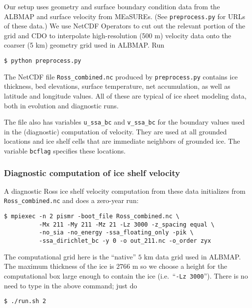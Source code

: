 Our setup uses geometry and surface boundary condition data from the ALBMAP and surface velocity from MEaSUREs.  (See \texttt{preprocess.py} for URLs of these data.)  We use NetCDF Operators to cut out the relevant portion of the grid and CDO to interpolate high-resolution (500 m) velocity data onto the coarser (5 km) geometry grid used in ALBMAP.  Run

\begin{verbatim}
$ python preprocess.py
\end{verbatim}%

The NetCDF file \texttt{Ross_combined.nc} produced by \texttt{preprocess.py} contains ice thickness, bed elevations, surface temperature, net accumulation, as well as latitude and longitude values.  All of these are typical of ice sheet modeling data, both in evolution and diagnostic runs.

The file also has variables \texttt{u_ssa_bc} and \texttt{v_ssa_bc} for the boundary values used in the (diagnostic) computation of velocity.  They are used at all grounded locations and ice shelf cells that are immediate neighbors of grounded ice.  The variable \texttt{bcflag} specifies these locations.


\subsubsection*{Diagnostic computation of ice shelf velocity}
A diagnostic Ross ice shelf velocity computation from these data initializes from \texttt{Ross_combined.nc} and does a zero-year run:

\begin{verbatim}
$ mpiexec -n 2 pismr -boot_file Ross_combined.nc \
          -Mx 211 -My 211 -Mz 21 -Lz 3000 -z_spacing equal \
          -no_sia -no_energy -ssa_floating_only -pik \
          -ssa_dirichlet_bc -y 0 -o out_211.nc -o_order zyx
\end{verbatim}%
The computational grid here is the ``native'' $5$ km data grid used in ALBMAP.  The maximum thickness of the ice is $2766$ m so we choose a height for the computational box large enough to contain the ice (i.e.~``\texttt{-Lz 3000}'').  There is no need to type in the above command; just do

\begin{verbatim}
$ ./run.sh 2
\end{verbatim}%

